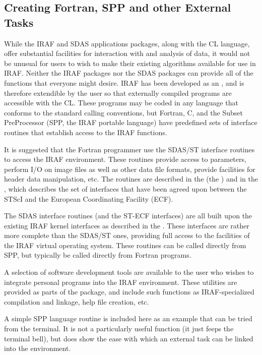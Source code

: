 \subsection{Creating Fortran, SPP and other External Tasks}

While the IRAF and SDAS applications packages, along with the CL 
language, offer substantial facilities for interaction with and 
analysis of data, it would not be unusual for users  to wish to 
make their existing algorithms available
for use in IRAF.  Neither the IRAF packages nor the SDAS packages
can provide all of the functions that everyone might desire. IRAF has been
developed as an , and is therefore extendible by the
user so that externally compiled programs are accessible with the CL.
These programs may be coded in any language that
conforms to the standard calling conventions, but Fortran, C, and the
Subset PreProcessor (SPP, the IRAF portable language) have predefined sets of
interface routines that establish access to the IRAF 
functions.

It is suggested that the Fortran programmer use the SDAS/ST
interface routines to access the IRAF environment.  These routines
provide access to parameters, perform I/O on image files as well as other data
file formats, provide facilities for header data manipulation, etc.
The routines are described in the  (the ) and in the , which describes the set of
interfaces that have been agreed upon between the STScI and the
European Coordinating Facility (ECF).

The SDAS interface routines (and the ST-ECF interfaces) are all 
built upon the existing IRAF kernel interfaces as described in the 
. These interfaces are rather
more complete than the SDAS/ST ones, providing full access to the facilities
of the IRAF virtual operating system. These routines can be called directly
from SPP, but typically  be called directly from
Fortran programs.

A selection of software development tools are available to the user who wishes
to integrate personal programs into the IRAF environment. These utilities
are provided as parts of the  package, and include such
functions as IRAF-specialized compilation and linkage, help file creation, etc.

A simple SPP language routine is included here as an example that
can be tried from the terminal.  It is not a particularly useful
function (it just feeps the terminal bell), but does show the
ease with which an external task can be linked into the environment.

